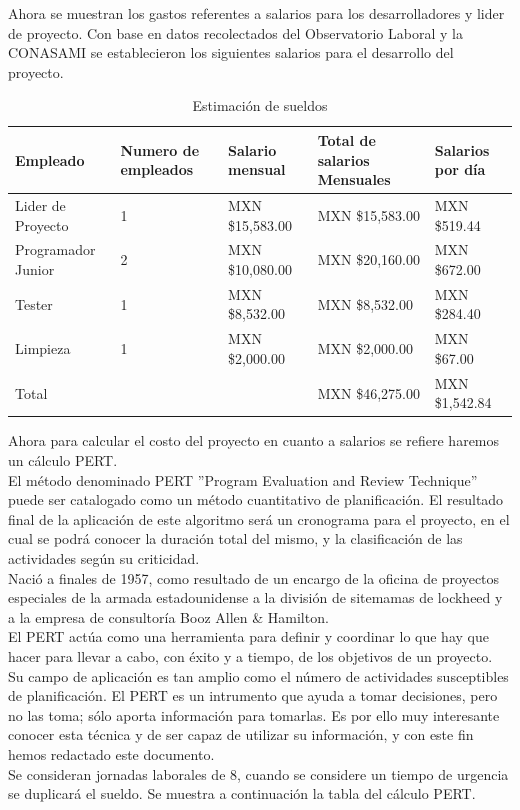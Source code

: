 \documentclass[12pt]{report}
\begin{document}
Ahora se muestran los gastos referentes a salarios para los desarrolladores y lider de proyecto. Con base en datos recolectados del Observatorio Laboral y la CONASAMI se establecieron los siguientes salarios para el desarrollo del proyecto.

\begin{table}[H]
\begin{center}
\begin{tabular}{|p{30mm}|p{20mm}|p{30mm}|p{30mm}|p{30mm}|}
\hline
Empleado & Numero de empleados & Salario mensual & Total de salarios Mensuales & Salarios por día \\
\hline \hline
Lider de Proyecto & 1 & MXN \$15,583.00 & MXN \$15,583.00 & MXN \$519.44\\
\hline
Programador Junior & 2 & MXN \$10,080.00 & MXN \$20,160.00 & MXN \$672.00 \\
\hline
Tester & 1 & MXN \$8,532.00 & MXN \$8,532.00 &  MXN \$284.40 \\
\hline
Limpieza & 1 & MXN \$2,000.00 & MXN \$2,000.00 & MXN \$67.00 \\
\hline \hline
Total &  &  & MXN \$46,275.00 & MXN \$1,542.84 \\
\hline
\end{tabular}
\caption{Estimación de sueldos}
\end{center}
\end{table}

Ahora para calcular el costo del proyecto en cuanto a salarios se refiere haremos un cálculo PERT.\\
El método denominado PERT ''Program Evaluation and Review Technique'' puede ser catalogado como un método cuantitativo de planificación.
El resultado final de la aplicación de este algoritmo será un cronograma para el proyecto, en el cual se podrá conocer la duración total del mismo, y la clasificación de las actividades según su criticidad. \\
Nació a finales de 1957, como resultado de un encargo de la oficina de proyectos especiales de la armada estadounidense a la división de sitemamas de lockheed y a la empresa de consultoría Booz Allen \& Hamilton.\\

El PERT actúa como una herramienta para definir y coordinar lo que hay que hacer para llevar a cabo, con éxito y a tiempo, de los objetivos de un proyecto. Su campo de aplicación es tan amplio como el número de actividades susceptibles de planificación.
El PERT es un intrumento que ayuda a tomar decisiones, pero no las toma; sólo aporta información para tomarlas. Es por ello muy interesante conocer esta técnica y de ser capaz de utilizar su información, y con este fin hemos redactado este documento.\cite{pert} \\
Se consideran jornadas laborales de 8, cuando se considere un tiempo de urgencia se duplicará el sueldo. Se muestra a continuación la tabla del cálculo PERT.
\end{document}
